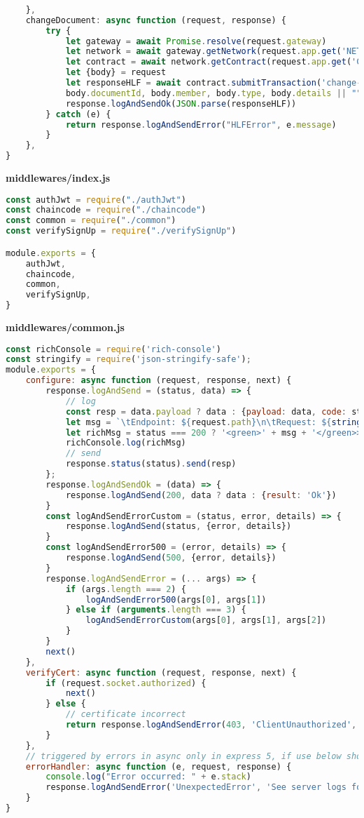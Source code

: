 \begin{lstlisting}[language=JavaScript]
		
	},
	changeDocument: async function (request, response) {
		try {
			let gateway = await Promise.resolve(request.gateway)
			let network = await gateway.getNetwork(request.app.get('NETWORK_NAME'))
			let contract = await network.getContract(request.app.get('CONTRACT_ID'));
			let {body} = request
			let responseHLF = await contract.submitTransaction('change-doc',
			body.documentId, body.member, body.type, body.details || "", body.attributes ? JSON.stringify(body.attributes) : "")
			response.logAndSendOk(JSON.parse(responseHLF))
		} catch (e) {
			return response.logAndSendError("HLFError", e.message)
		}
	},
}	
\end{lstlisting}

\textbf{middlewares/index.js}
\begin{lstlisting}[language=JavaScript]
const authJwt = require("./authJwt")
const chaincode = require("./chaincode")
const common = require("./common")
const verifySignUp = require("./verifySignUp")

module.exports = {
	authJwt,
	chaincode,
	common,
	verifySignUp,
}	
\end{lstlisting}

\textbf{middlewares/common.js}
\begin{lstlisting}[language=JavaScript]
const richConsole = require('rich-console')
const stringify = require('json-stringify-safe');
module.exports = {
	configure: async function (request, response, next) {
		response.logAndSend = (status, data) => {
			// log
			const resp = data.payload ? data : {payload: data, code: status === 200 ? 'Ok' : 'Nok'}
			let msg = `\tEndpoint: ${request.path}\n\tRequest: ${stringify(request.body)}\n\tResponse (Code:${status}): ${stringify(resp)}\n`
			let richMsg = status === 200 ? '<green>' + msg + '</green>>' : '<red>' + msg + '</red>>'
			richConsole.log(richMsg)
			// send
			response.status(status).send(resp)
		};
		response.logAndSendOk = (data) => {
			response.logAndSend(200, data ? data : {result: 'Ok'})
		}
		const logAndSendErrorCustom = (status, error, details) => {
			response.logAndSend(status, {error, details})
		}
		const logAndSendError500 = (error, details) => {
			response.logAndSend(500, {error, details})
		}
		response.logAndSendError = (... args) => {
			if (args.length === 2) {
				logAndSendError500(args[0], args[1])
			} else if (arguments.length === 3) {
				logAndSendErrorCustom(args[0], args[1], args[2])
			}
		}
		next()
	},
	verifyCert: async function (request, response, next) {
		if (request.socket.authorized) {
			next()
		} else {
			// certificate incorrect
		 	return response.logAndSendError(403, 'ClientUnauthorized', 'Client app certificate is not valid.')
		}
	},
	// triggered by errors in async only in express 5, if use below should get wrapper with try { await willThrow() } catch (e) { next(e) }
	errorHandler: async function (e, request, response) {
		console.log("Error occurred: " + e.stack)
		response.logAndSendError('UnexpectedError', 'See server logs for details.')
	}
}	
\end{lstlisting}

